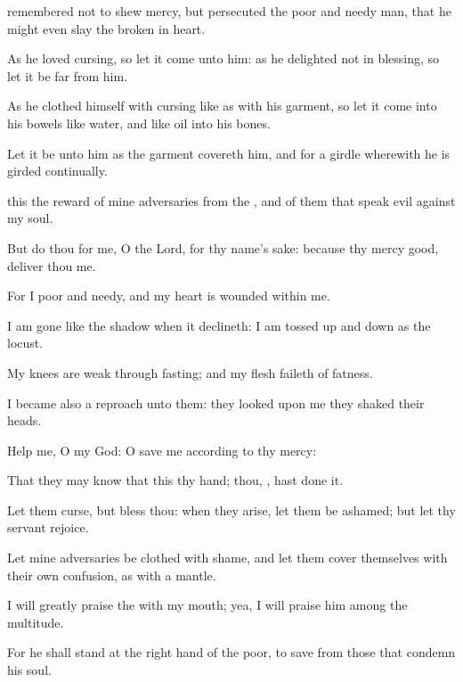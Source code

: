 {remembered not to
shew
mercy, but
persecuted the
poor and
needy
man, that he might even
slay the
broken in
heart.
\par }{\Q {}As he
loved
cursing, so let it
come unto him: as he
delighted not in
blessing, so let it be
far from him.
\par }{\Q {}As he
clothed himself with
cursing like as with his
garment, so let it
come into his
bowels like
water, and like
oil into his
bones.
\par }{\Q {}Let it be unto him as the
garment
{}
covereth him, and for a
girdle wherewith he is
girded
continually.
\par }{\Q {} this
{} the
reward of mine
adversaries from the
{}, and of them that
speak
evil against my
soul.
\par }{\BB \par }{\Q {}But
do thou for me, O
{} the
Lord, for thy
name’s sake: because thy
mercy
{}
good,
deliver thou me.
\par }{\Q {}For I
{}
poor and
needy, and my
heart is
wounded
within me.
\par }{\Q {}I am
gone like the
shadow when it
declineth: I am tossed up and
down as the
locust.
\par }{\Q {}My
knees are
weak through
fasting; and my
flesh
faileth of
fatness.
\par }{\Q {}I became also a
reproach unto them:
{} they
looked upon me they
shaked their
heads.
\par }{\Q {}Help me, O
{} my
God: O
save me according to thy
mercy:
\par }{\Q {}That they may
know that this
{} thy
hand;
{} thou,
{}, hast
done it.
\par }{\Q {}Let them
curse, but
bless thou: when they
arise, let them be
ashamed; but let thy
servant
rejoice.
\par }{\Q {}Let mine
adversaries be
clothed with
shame, and let them
cover themselves with their own
confusion, as with a
mantle.
\par }{\Q {}I will
greatly
praise the
{} with my
mouth; yea, I will
praise him
among the
multitude.
\par }{\Q {}For he shall
stand at the right
hand of the
poor, to
save
{} from those that
condemn his
soul.

}
